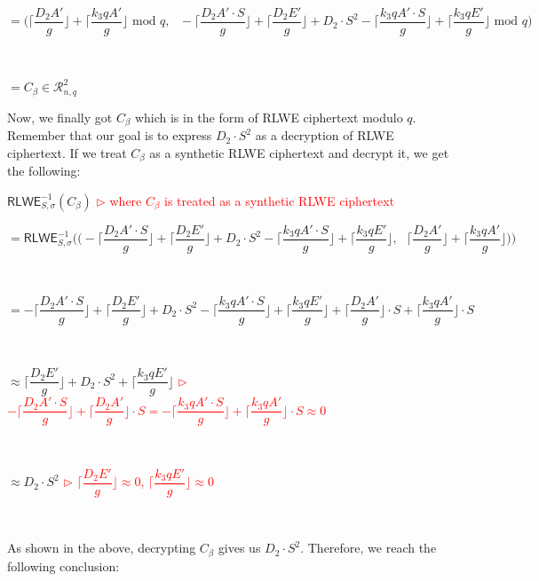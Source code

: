$ $

$= \Bigg(\Bigg\lceil\dfrac{D_2A'}{g}\Bigg\rfloor +\Bigg\lceil\dfrac{k_3qA'}{g}\Bigg\rfloor \text{ mod } q,  \text{ } -\Bigg\lceil\dfrac{D_2A'\cdot S}{g}\Bigg\rfloor + \Bigg\lceil\dfrac{D_2E'}{g}\Bigg\rfloor + D_2\cdot S^2
-\Bigg\lceil\dfrac{k_3qA'\cdot S}{g}\Bigg\rfloor + \Bigg\lceil\dfrac{k_3qE'}{g}\Bigg\rfloor \text{ mod } q\Bigg)$

$ $

$= C_\beta \in \mathcal{R}_{n, q}^2$

Now, we finally got $C_\beta$ which is in the form of RLWE ciphertext modulo $q$. Remember that our goal is to express $D_2\cdot S^2$ as a decryption of RLWE ciphertext. If we treat $C_\beta$ as a synthetic RLWE ciphertext and decrypt it, we get the following:

\noindent $\textsf{RLWE}^{-1}_{S, \sigma}(C_\beta)$ \textcolor{red}{  $\rhd$ where $C_\beta$ is treated as a synthetic RLWE ciphertext}

\noindent $=  \textsf{RLWE}^{-1}_{S, \sigma}\Bigg( \Bigg(-\Bigg\lceil\dfrac{D_2A'\cdot S}{g}\Bigg\rfloor + \Bigg\lceil\dfrac{D_2E'}{g}\Bigg\rfloor + D_2\cdot S^2
-\Bigg\lceil\dfrac{k_3qA'\cdot S}{g}\Bigg\rfloor + \Bigg\lceil\dfrac{k_3qE'}{g}\Bigg\rfloor, \text{ } \Bigg\lceil\dfrac{D_2A'}{g}\Bigg\rfloor +\Bigg\lceil\dfrac{k_3qA'}{g}\Bigg\rfloor\Bigg)\Bigg)$

$ $

\noindent $=  -\Bigg\lceil\dfrac{D_2A'\cdot S}{g}\Bigg\rfloor + \Bigg\lceil\dfrac{D_2E'}{g}\Bigg\rfloor + D_2\cdot S^2
-\Bigg\lceil\dfrac{k_3qA'\cdot S}{g}\Bigg\rfloor + \Bigg\lceil\dfrac{k_3qE'}{g}\Bigg\rfloor + \Bigg\lceil\dfrac{D_2A'}{g}\Bigg\rfloor\cdot S + \Bigg\lceil\dfrac{k_3qA'}{g}\Bigg\rfloor\cdot S$

$ $

\noindent $\approx \Bigg\lceil\dfrac{D_2E'}{g}\Bigg\rfloor + D_2\cdot S^2
 + \Bigg\lceil\dfrac{k_3qE'}{g}\Bigg\rfloor$ \textcolor{red}{  $\rhd$ $-\Bigg\lceil\dfrac{D_2A'\cdot S}{g}\Bigg\rfloor + \Bigg\lceil\dfrac{D_2A'}{g}\Bigg\rfloor\cdot S = -\Bigg\lceil\dfrac{k_3qA'\cdot S}{g}\Bigg\rfloor + \Bigg\lceil\dfrac{k_3qA'}{g}\Bigg\rfloor\cdot S \approx 0$}

$ $

\noindent $\approx D_2\cdot S^2$ \textcolor{red}{  $\rhd$ 
  $\Bigg\lceil\dfrac{D_2E'}{g}\Bigg\rfloor \approx 0$, \text{ } $\Bigg\lceil\dfrac{k_3qE'}{g}\Bigg\rfloor \approx 0$}


$ $

As shown in the above, decrypting $C_\beta$ gives us $D_2\cdot S^2$. Therefore, we reach the following conclusion: 

